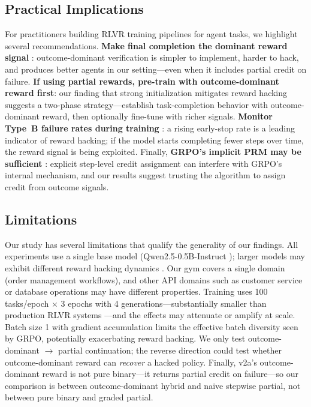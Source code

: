 \documentclass[11pt]{article}
\begin{document}
\subsection{Practical Implications}

For practitioners building RLVR training pipelines for agent tasks, we highlight several recommendations.
\textbf{Make final completion the dominant reward signal} \citep{gao2024designing}: outcome-dominant verification is simpler to implement, harder to hack, and produces better agents in our setting---even when it includes partial credit on failure.
\textbf{If using partial rewards, pre-train with outcome-dominant reward first}: our finding that strong initialization mitigates reward hacking suggests a two-phase strategy---establish task-completion behavior with outcome-dominant reward, then optionally fine-tune with richer signals. \textbf{Monitor Type~B failure rates during training} \citep{casper2023rewardhacking}: a rising early-stop rate is a leading indicator of reward hacking; if the model starts completing fewer steps over time, the reward signal is being exploited.
Finally, \textbf{GRPO's implicit PRM may be sufficient} \citep{sullivan2025grpoprm}: explicit step-level credit assignment can interfere with GRPO's internal mechanism, and our results suggest trusting the algorithm to assign credit from outcome signals.

\subsection{Limitations}

Our study has several limitations that qualify the generality of our findings.
All experiments use a single base model (Qwen2.5-0.5B-Instruct \citep{qwen2025qwen25}); larger models may exhibit different reward hacking dynamics \citep{deepseek2025r1}.
Our gym covers a single domain (order management workflows), and other API domains such as customer service or database operations may have different properties.
Training uses 100 tasks/epoch $\times$ 3 epochs with 4 generations---substantially smaller than production RLVR systems \citep{deepseek2025r1,agentrl2025}---and the effects may attenuate or amplify at scale.
Batch size 1 with gradient accumulation limits the effective batch diversity seen by GRPO, potentially exacerbating reward hacking.
We only test outcome-dominant $\to$ partial continuation; the reverse direction could test whether outcome-dominant reward can \emph{recover} a hacked policy.
Finally, v2a's outcome-dominant reward is not pure binary---it returns partial credit on failure---so our comparison is between outcome-dominant hybrid and naive stepwise partial, not between pure binary and graded partial.
\end{document}
